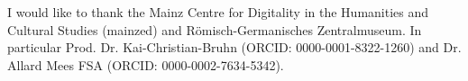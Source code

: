 \documentclass[twocolumn]{autart}
\begin{document}
\begin{ack}                               
I would like to thank the Mainz Centre for Digitality in the Humanities and Cultural Studies (mainzed) and R\"omisch-Germanisches Zentralmuseum. In particular Prod. Dr. Kai-Christian-Bruhn (ORCID: 0000-0001-8322-1260) and Dr. Allard Mees FSA (ORCID: 0000-0002-7634-5342).
\end{ack}

\end{document}
